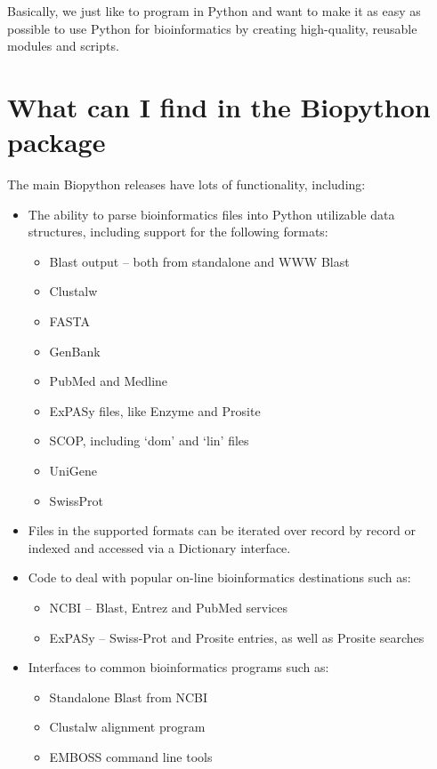 \documentclass{report}
\begin{document}
Basically, we just like to program in Python and want to make it as easy as possible to use Python for bioinformatics by creating high-quality, reusable modules and scripts.

\section{What can I find in the Biopython package}

The main Biopython releases have lots of functionality, including:

\begin{itemize}
  \item The ability to parse bioinformatics files into Python utilizable data structures, including support for the following formats:

  \begin{itemize}
    \item Blast output -- both from standalone and WWW Blast
    \item Clustalw
    \item FASTA
    \item GenBank
    \item PubMed and Medline
    \item ExPASy files, like Enzyme and Prosite
    \item SCOP, including `dom' and `lin' files
    \item UniGene
    \item SwissProt
  \end{itemize}

  \item Files in the supported formats can be iterated over record by record or indexed and accessed via a Dictionary interface.

  \item Code to deal with popular on-line bioinformatics destinations such as:

  \begin{itemize}
    \item NCBI -- Blast, Entrez and PubMed services
    \item ExPASy -- Swiss-Prot and Prosite entries, as well as Prosite searches
  \end{itemize}

  \item Interfaces to common bioinformatics programs such as:

  \begin{itemize}
    \item Standalone Blast from NCBI
    \item Clustalw alignment program
    \item EMBOSS command line tools
  \end{itemize}


\end{itemize}
\end{document}
